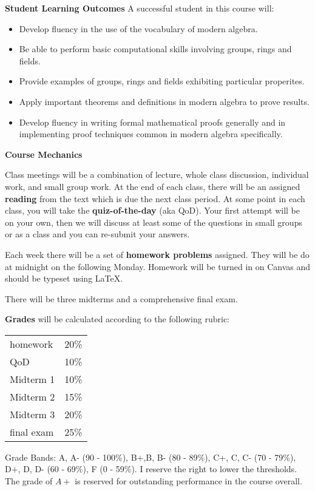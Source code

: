 \documentclass[12pt]{article}
\begin{document}
\textbf{\large{Student Learning Outcomes}} A successful student in this course will:
\begin{itemize}
\item Develop fluency in the use of the vocabulary of modern algebra.
\item Be able to perform basic computational skills involving groups, rings and fields.
\item Provide examples of groups, rings and fields exhibiting particular properites.
\item Apply important theorems and definitions in modern algebra to prove results.
\item Develop fluency in writing formal mathematical proofs generally and in implementing proof techniques common in modern algebra specifically. 
\end{itemize}

{\textbf{\large{Course Mechanics}}}

Class meetings will be a combination of lecture, whole class discussion, individual work, and small group work. At the end of each class, there will be an assigned \textbf{reading} from the text which is due the next class period. At some point in each class, you will take the \textbf{quiz-of-the-day} (aka QoD). Your first attempt will be on your own, then we will discuss at least some of the questions in small groups or as a class and you can re-submit your answers.

Each week there will be a set of \textbf{homework problems} assigned. They will be do at midnight on the following Monday. Homework will be turned in on Canvas and should be typeset using \LaTeX.

There will be three midterms and a comprehensive final exam.

\begin{multicols}{2}
\textbf{Grades} will be calculated according to the following rubric:


\begin{tabular}{|l|c|}
  \hline
  homework & 20\% \\
  QoD & 10\%\\
  Midterm 1 & 10\%\\
  Midterm 2 & 15\%\\
  Midterm 3 & 20\%\\
  final exam & 25\% \\
  \hline
\end{tabular}
\end{multicols}
Grade Bands: A, A- (90 - 100\%), B+,B, B- (80 - 89\%), C+, C, C- (70 - 79\%), D+, D, D-
(60 - 69\%), F (0 - 59\%).  I reserve the right to lower the thresholds. The grade of $A+$ is reserved for outstanding performance in the course overall.\\
\end{document}
